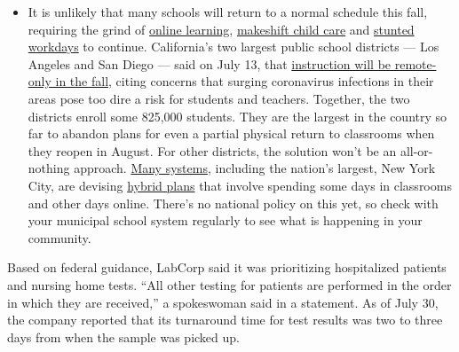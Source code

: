 \begin{itemize}
  \begin{itemize}
  \tightlist
  \item
    It is unlikely that many schools will return to a normal schedule
    this fall, requiring the grind of
    \href{https://www.nytimes.com/2020/06/05/us/coronavirus-education-lost-learning.html?action=click\&pgtype=Article\&state=default\&region=MAIN_CONTENT_3\&context=storylines_faq}{online
    learning},
    \href{https://www.nytimes.com/2020/05/29/us/coronavirus-child-care-centers.html?action=click\&pgtype=Article\&state=default\&region=MAIN_CONTENT_3\&context=storylines_faq}{makeshift
    child care} and
    \href{https://www.nytimes.com/2020/06/03/business/economy/coronavirus-working-women.html?action=click\&pgtype=Article\&state=default\&region=MAIN_CONTENT_3\&context=storylines_faq}{stunted
    workdays} to continue. California's two largest public school
    districts --- Los Angeles and San Diego --- said on July 13, that
    \href{https://www.nytimes.com/2020/07/13/us/lausd-san-diego-school-reopening.html?action=click\&pgtype=Article\&state=default\&region=MAIN_CONTENT_3\&context=storylines_faq}{instruction
    will be remote-only in the fall}, citing concerns that surging
    coronavirus infections in their areas pose too dire a risk for
    students and teachers. Together, the two districts enroll some
    825,000 students. They are the largest in the country so far to
    abandon plans for even a partial physical return to classrooms when
    they reopen in August. For other districts, the solution won't be an
    all-or-nothing approach.
    \href{https://bioethics.jhu.edu/research-and-outreach/projects/eschool-initiative/school-policy-tracker/}{Many
    systems}, including the nation's largest, New York City, are
    devising
    \href{https://www.nytimes.com/2020/06/26/us/coronavirus-schools-reopen-fall.html?action=click\&pgtype=Article\&state=default\&region=MAIN_CONTENT_3\&context=storylines_faq}{hybrid
    plans} that involve spending some days in classrooms and other days
    online. There's no national policy on this yet, so check with your
    municipal school system regularly to see what is happening in your
    community.
  \end{itemize}
\end{itemize}

Based on federal guidance, LabCorp said it was prioritizing hospitalized
patients and nursing home tests. ``All other testing for patients are
performed in the order in which they are received,'' a spokeswoman said
in a statement. As of July 30, the company reported that its turnaround
time for test results was two to three days from when the sample was
picked up.

